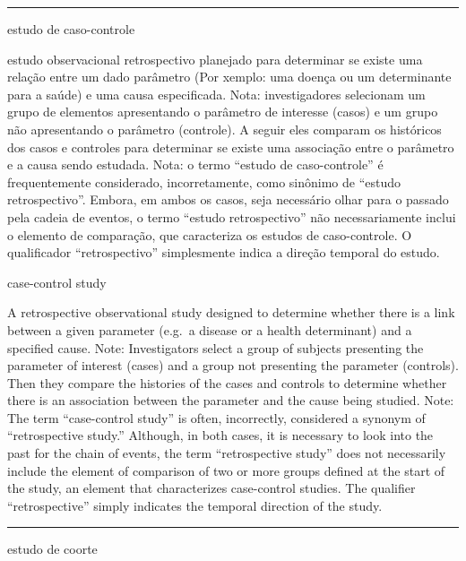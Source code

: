 \documentclass[
]{book}
\begin{document}
\begin{center}\rule{0.5\linewidth}{0.5pt}\end{center}

estudo de caso-controle

estudo observacional retrospectivo planejado para determinar se existe uma relação entre um dado parâmetro (Por xemplo: uma doença ou um determinante para a saúde) e uma causa especificada. Nota: investigadores selecionam um grupo de elementos apresentando o parâmetro de interesse (casos) e um grupo não apresentando o parâmetro (controle). A seguir eles comparam os históricos dos casos e controles para determinar se existe uma associação entre o parâmetro e a causa sendo estudada. Nota: o termo ``estudo de caso-controle'' é frequentemente considerado, incorretamente, como sinônimo de ``estudo retrospectivo''. Embora, em ambos os casos, seja necessário olhar para o passado pela cadeia de eventos, o termo ``estudo retrospectivo'' não necessariamente inclui o elemento de comparação, que caracteriza os estudos de caso-controle. O qualificador ``retrospectivo'' simplesmente indica a direção temporal do estudo.

case-control study

A retrospective observational study designed to determine whether there is a link between a given parameter (e.g.~a disease or a health determinant) and a specified cause. Note: Investigators select a group of subjects presenting the parameter of interest (cases) and a group not presenting the parameter (controls). Then they compare the histories of the cases and controls to determine whether there is an association between the parameter and the cause being studied. Note: The term ``case-control study'' is often, incorrectly, considered a synonym of ``retrospective study.'' Although, in both cases, it is necessary to look into the past for the chain of events, the term ``retrospective study'' does not necessarily include the element of comparison of two or more groups defined at the start of the study, an element that characterizes case-control studies. The qualifier ``retrospective'' simply indicates the temporal direction of the study.

\begin{center}\rule{0.5\linewidth}{0.5pt}\end{center}

estudo de coorte
\end{document}
